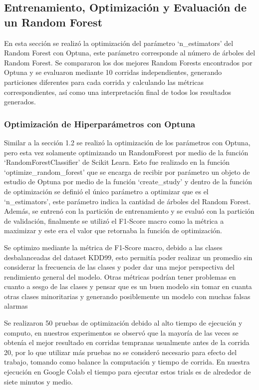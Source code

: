 \documentclass[12pt,a4paper]{article}
\begin{document}
\subsection{Entrenamiento, Optimización y Evaluación de un Random Forest}

En esta sección se realizó la optimización del parámetro `n_estimators' del Random Forest con Optuna,
este parámetro corresponde al número de árboles del Random Forest.
Se compararon los dos mejores Random Forests encontrados por Optuna y se evaluaron mediante 10 corridas independientes,
generando particiones diferentes para cada corrida y calculando las métricas correspondientes,
así como una interpretación final de todos los resultados generados.

\subsubsection{Optimización de Hiperparámetros con Optuna}

Similar a la sección 1.2 se realizó la optimización de los parámetros con Optuna, pero esta vez solamente
optimizando un RandomForest por medio de la función `RandomForestClassifier' de Scikit Learn.
Esto fue realizado en la función `optimize_random_forest' que se encarga de recibir por
parámetro un objeto de estudio de Optuna por medio de la función `create_study' y dentro de la función
de optimización se definió el único parámetro a optimizar que es el `n_estimators', este parámetro
indica la cantidad de árboles del Random Forest.
Además, se entrenó con la partición de entrenamiento y se evaluó con la partición de validación,
finalmente se utilizó el F1-Score macro como la métrica a maximizar y este era el valor que retornaba la función de optimización.

Se optimizo mediante la métrica de F1-Score macro, debido a las clases desbalanceadas del dataset KDD99, esto
permitía poder realizar un promedio sin considerar la frecuencia de las clases y poder dar una mejor
perspectiva del rendimiento general del modelo. Otras métricas podrían tener problemas en cuanto a sesgo de las clases
y pensar que es un buen modelo sin tomar en cuanta otras clases minoritarias y generando posiblemente un modelo
con muchas falsas alarmas

Se realizaron 50 pruebas de optimización debido al alto tiempo de ejecución y computo, en nuestros experimentos se observó que
la mayoría de las veces se obtenía el mejor resultado en corridas tempranas usualmente antes de la corrida 20, por lo que utilizar
más pruebas no se consideró necesario para efecto del trabajo, tomando como balance la computación y tiempo de corrida.
En nuestra ejecución en Google Colab el tiempo para ejecutar estos trials es de alrededor de siete minutos y medio.
\end{document}
